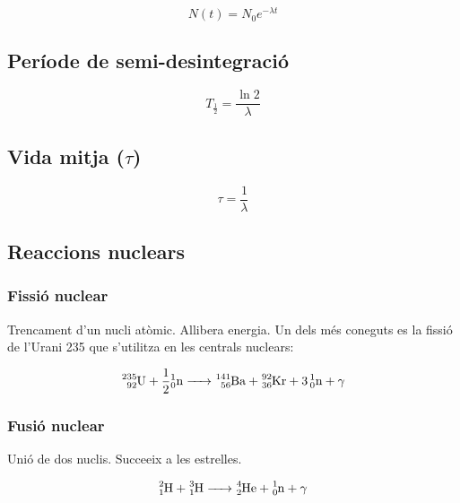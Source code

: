 \begin{equation}
N(t) = N_0e^{-\lambda t}
\end{equation}

\subsection{Període de semi-desintegració}
\label{sub:periode_de_semi_desintegracio}

\begin{equation}
T_{\frac{1}{2}} = \frac{\ln 2}{\lambda}
\end{equation}

\subsection{Vida mitja ($\tau$)}
\label{sub:vida_mitja_tau_}

\begin{equation}
    \tau = \frac{1}{\lambda}
\end{equation}

\subsection{Reaccions nuclears}
\label{sub:reaccions_nuclears}

\subsubsection{Fissió nuclear}
\label{ssub:fissio_nuclear}

Trencament d'un nucli atòmic. Allibera energia.
Un dels més coneguts es la fissió de l'Urani 235 que s'utilitza en les centrals
nuclears:

\begin{equation}
    \ce{
        ^{235}_{92}U + \frac{1}{2}{^1_0n} -> ^{141}_{56}Ba + ^{92}_{36}Kr + 3{^1_0n} + \gamma
    }
\end{equation}

\subsubsection{Fusió nuclear}
\label{ssub:fusio_nuclear}

Unió de dos nuclis. Succeeix a les estrelles.

\begin{equation}
    \ce{
        ^2_1H + ^3_1H -> ^4_2He + ^1_0n + \gamma
    }
\end{equation}

